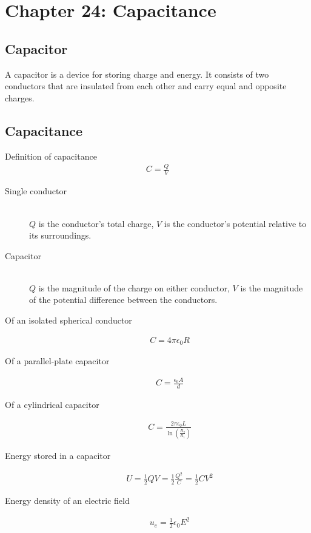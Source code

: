 \documentclass[../main.tex]{subfiles}
\begin{document}
\section{Chapter 24: Capacitance}
\label{sec:chapter_24_capacitance}

\subsection{Capacitor}
\label{sub:capacitor}

A capacitor is a device for storing charge and energy. It consists of two
conductors that are insulated from each other and carry equal and opposite
charges.

\subsection{Capacitance}
\label{sub:capacitance}

Definition of capacitance
\begin{align}
  C = \frac{Q}{V}
\end{align}

\begin{description}
  \item[Single conductor] \hfill \\
    $Q$ is the conductor's total charge, $V$ is the conductor's potential
    relative to its surroundings.
  \item[Capacitor] \hfill \\
    $Q$ is the magnitude of the charge on either conductor, $V$ is the
    magnitude of the potential difference between the conductors.
  \item[Of an isolated spherical conductor]
    \begin{align}
       C = 4\pi\epsilon_0R
    \end{align}
  \item[Of a parallel-plate capacitor]
    \begin{align}
      C= \frac{\epsilon_0A}{d}
    \end{align}
  \item[Of a cylindrical capacitor]
    \begin{align}
      C = \frac{2\pi\epsilon_0L}{\ln\left(\frac{R_2}{R_1}\right)}
    \end{align}
  \item[Energy stored in a capacitor]
    \begin{align}
      U = \frac{1}{2}QV = \frac{1}{2}\frac{Q^2}{C} = \frac{1}{2}CV^2
    \end{align}
  \item[Energy density of an electric field]
    \begin{align}
      u_e = \frac{1}{2}\epsilon_0E^2
    \end{align}
\end{description}
\end{document}
